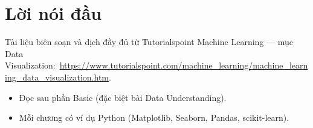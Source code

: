 \documentclass[12pt,a4paper]{article}
\newcommand{\tsurl}[1]{\url{#1}}
\begin{document}

\newpage
\tableofcontents
\newpage

\section*{Lời nói đầu}

\begin{ynghia}[title={Nguồn}]
Tài liệu biên soạn và dịch đầy đủ từ Tutorialspoint Machine Learning --- mục Data Visualization:\ \tsurl{https://www.tutorialspoint.com/machine_learning/machine_learning_data_visualization.htm}.
\end{ynghia}

\begin{phuongphap}[title={Cách dùng}]
\begin{itemize}
  \item Đọc sau phần Basic (đặc biệt bài Data Understanding).
  \item Mỗi chương có ví dụ Python (Matplotlib, Seaborn, Pandas, scikit-learn).
\end{itemize}
\end{phuongphap}

\newpage








\end{document}
